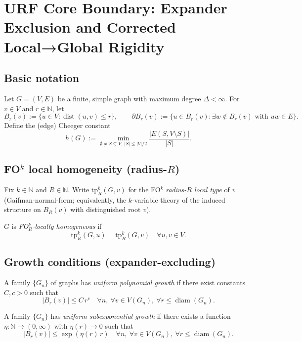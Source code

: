 
\section{URF Core Boundary: Expander Exclusion and Corrected Local→Global Rigidity}

\subsection{Basic notation}
Let $G=(V,E)$ be a finite, simple graph with maximum degree $\Delta<\infty$.
For $v\in V$ and $r\in\mathbb N$, let
\[
B_r(v):=\{u\in V:\operatorname{dist}(u,v)\le r\},
\qquad
\partial B_r(v):=\{u\in B_r(v):\exists w\notin B_r(v)\text{ with }uw\in E\}.
\]
Define the (edge) Cheeger constant
\[
h(G):=\min_{\emptyset\ne S\subsetneq V,\ |S|\le |V|/2}\frac{|E(S,V\setminus S)|}{|S|}.
\]

\subsection{FO$^k$ local homogeneity (radius-$R$)}
Fix $k\in\mathbb N$ and $R\in\mathbb N$.
Write $\mathrm{tp}^{k}_R(G,v)$ for the FO$^k$ \emph{radius-$R$ local type} of $v$ (Gaifman-normal-form; equivalently, the $k$-variable theory of the induced structure on $B_R(v)$ with distinguished root $v$).

\begin{definition}
$G$ is \emph{FO$^k_R$-locally homogeneous} if
\[
\mathrm{tp}^{k}_R(G,u)=\mathrm{tp}^{k}_R(G,v)\quad\forall u,v\in V.
\]
\end{definition}

\subsection{Growth conditions (expander-excluding)}
\begin{definition}
A family $\{G_n\}$ of graphs has \emph{uniform polynomial growth} if there exist constants $C,c>0$ such that
\[
|B_r(v)|\le C\, r^{c}\quad\forall n,\ \forall v\in V(G_n),\ \forall r\le \operatorname{diam}(G_n).
\]
\end{definition}

\begin{definition}
A family $\{G_n\}$ has \emph{uniform subexponential growth} if there exists a function $\eta:\mathbb N\to(0,\infty)$ with $\eta(r)\to 0$ such that
\[
|B_r(v)|\le \exp(\eta(r)\,r)\quad\forall n,\ \forall v\in V(G_n),\ \forall r\le \operatorname{diam}(G_n).
\]
\end{definition}

